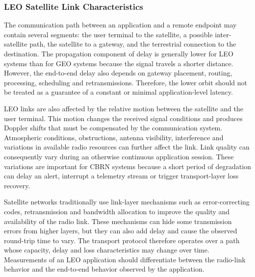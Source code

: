 \subsubsection{LEO Satellite Link Characteristics}
The communication path between an application and a remote endpoint may contain several segments: the user terminal to the satellite, a possible inter-satellite path, the satellite to a gateway, and the terrestrial connection to the destination. The propagation component of delay is generally lower for LEO systems than for GEO systems because the signal travels a shorter distance. However, the end-to-end delay also depends on gateway placement, routing, processing, scheduling and retransmissions. Therefore, the lower orbit should not be treated as a guarantee of a constant or minimal application-level latency.~\citep{Sun2014}
\par
LEO links are also affected by the relative motion between the satellite and the user terminal. This motion changes the received signal conditions and produces Doppler shifts that must be compensated by the communication system. Atmospheric conditions, obstructions, antenna visibility, interference and variations in available radio resources can further affect the link. Link quality can consequently vary during an otherwise continuous application session. These variations are important for CBRN systems because a short period of degradation can delay an alert, interrupt a telemetry stream or trigger transport-layer loss recovery.
\par
Satellite networks traditionally use link-layer mechanisms such as error-correcting codes, retransmission and bandwidth allocation to improve the quality and availability of the radio link. These mechanisms can hide some transmission errors from higher layers, but they can also add delay and cause the observed round-trip time to vary. The transport protocol therefore operates over a path whose capacity, delay and loss characteristics may change over time. Measurements of an LEO application should differentiate between the radio-link behavior and the end-to-end behavior observed by the application.~\citep{Sun2014}
